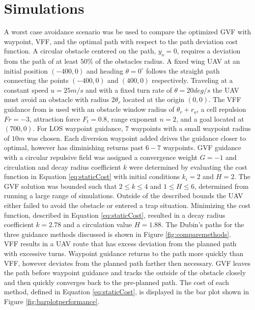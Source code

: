 \documentclass[conf]{new-aiaa}
\begin{document}
\section{Simulations}

A worst case avoidance scenario was be used to compare the optimized GVF with waypoint, VFF, and the optimal path with respect to the path deviation cost function. A circular obstacle centered on the path, $y_o = 0$, requires a deviation from the path of at least $50\% $ of the obstacles radius. A fixed wing UAV at an initial position $(-400,0)$ and heading $\theta=0^\circ$ follows the straight path connecting the points $(-400,0)$ and $(400,0)$ respectively. Traveling at a constant speed $u=25 m/s$ and with a fixed turn rate of $\dot{\theta}=20 deg/s$ the UAV must avoid an obstacle with radius $2\theta_r$ located at the origin $(0,0)$. The VFF guidance from \cite{borenstein_real-time_1990} is used with an obstacle window radius of $\theta_r+r_o$, a cell repulsion $Fr=-3$, attraction force $F_t=0.8$, range exponent $n=2$, and a goal located at $(700,0)$. For LOS waypoint guidance, $7$ waypoints with a small waypoint radius of $10m$ was chosen. Each diversion waypoint added drives the guidance closer to optimal, however has diminishing returns past $6-7$ waypoints. GVF guidance with a circular repulsive field was assigned a convergence weight $G=-1$ and circulation and decay radius coefficient $k$ were determined by evaluating the cost function in Equation \ref{eq:staticCost} with initial conditions $k_i = 2$ and $H=2$. The GVF solution was bounded such that $2\leq k\leq 4$ and $1\leq H\leq 6$, determined from running a large range of simulations. Outside of the described bounds the UAV either failed to avoid the obstacle or entered a trap situation.  Minimizing the cost function, described in Equation \ref{eq:staticCost}, resulted in a decay radius coefficient $k=2.78$ and a circulation value $H=1.88$. The Dubin's paths for the three guidance methods discussed is shown in Figure \ref{fig:comparemethods}. \\

VFF results in a UAV route that has excess deviation from the planned path with excessive turns. Waypoint guidance returns to the path more quickly than VFF, however deviates from the planned path farther then necessary. GVF leaves the path before waypoint guidance and tracks the outside of the obstacle closely and then quickly converges back to the pre-planned path. The cost of each method, defined in Equation \ref{eq:staticCost}, is displayed in the bar plot shown in Figure \ref{fig:barplotperformance}.
\end{document}
